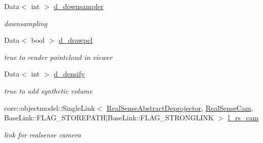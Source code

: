 \begin{DoxyCompactItemize}
Data$<$ int $>$ \hyperlink{classsofa_1_1rgbdtracking_1_1_real_sense_abstract_deprojector_aa28563fc31f5d63f1df5b32940a2e305}{d\+\_\+downsampler}
\begin{DoxyCompactList}\small\item\em downsampling \end{DoxyCompactList}\item 
\mbox{\label{classsofa_1_1rgbdtracking_1_1_real_sense_abstract_deprojector_afd99828d27af6b6c40cc17dec09fd818}} 
Data$<$ bool $>$ \hyperlink{classsofa_1_1rgbdtracking_1_1_real_sense_abstract_deprojector_afd99828d27af6b6c40cc17dec09fd818}{d\+\_\+drawpcl}
\begin{DoxyCompactList}\small\item\em true to render pointcloud in viewer \end{DoxyCompactList}\item 
\mbox{\label{classsofa_1_1rgbdtracking_1_1_real_sense_abstract_deprojector_ac850857f7f2460b014b5d16545904231}} 
Data$<$ int $>$ \hyperlink{classsofa_1_1rgbdtracking_1_1_real_sense_abstract_deprojector_ac850857f7f2460b014b5d16545904231}{d\+\_\+densify}
\begin{DoxyCompactList}\small\item\em true to add synthetic volume \end{DoxyCompactList}\item 
\mbox{\label{classsofa_1_1rgbdtracking_1_1_real_sense_abstract_deprojector_aab3f3872a892158eb75c162ceb9dc270}} 
core\+::objectmodel\+::\+Single\+Link$<$ \hyperlink{classsofa_1_1rgbdtracking_1_1_real_sense_abstract_deprojector}{Real\+Sense\+Abstract\+Deprojector}, \hyperlink{classsofa_1_1rgbdtracking_1_1_real_sense_cam}{Real\+Sense\+Cam}, Base\+Link\+::\+F\+L\+A\+G\+\_\+\+S\+T\+O\+R\+E\+P\+A\+TH$\vert$Base\+Link\+::\+F\+L\+A\+G\+\_\+\+S\+T\+R\+O\+N\+G\+L\+I\+NK $>$ \hyperlink{classsofa_1_1rgbdtracking_1_1_real_sense_abstract_deprojector_aab3f3872a892158eb75c162ceb9dc270}{l\+\_\+rs\+\_\+cam}
\begin{DoxyCompactList}\small\item\em link for realsense camera \end{DoxyCompactList}\item 
\mbox{\label{classsofa_1_1rgbdtracking_1_1_real_sense_abstract_deprojector_a3317c507cc889b1537c708abb50196da}} 

\end{DoxyCompactItemize}
